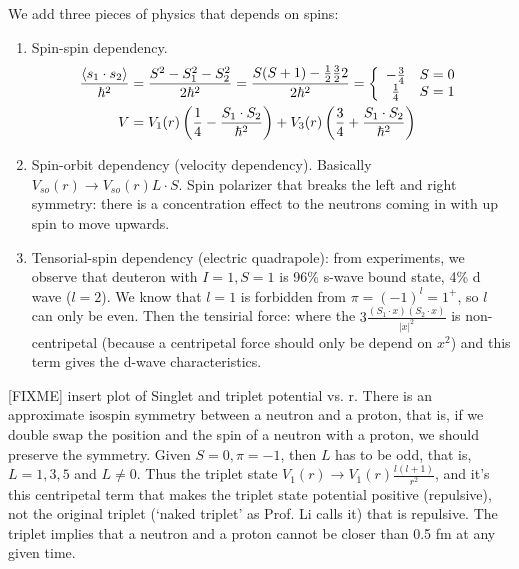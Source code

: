 \documentclass{school-22.101-notes}
\begin{document}
We add three pieces of physics that depends on spins: 
\begin{enumerate}
\item Spin-spin dependency. 
\begin{align}
 \frac{\left< s_1 \cdot s_2 \right>}{\hbar^2} &= \frac{S^2 - S_1^2 - S_2^2}{2 \hbar^2}  = \frac{S(S+1) - \frac{1}{2} \frac{3}{2} 2 }{2 \hbar^2} = \left\{  \begin{array}{cc} - \frac{3}{4} & S = 0 \\ \frac{1}{4}  & S= 1 \end{array} \right. \\
V &= V_1 (r) \left( \frac{1}{4} - \frac{S_1 \cdot S_2}{\hbar^2} \right) + V_3 (r) \left( \frac{3}{4} + \frac{S_1 \cdot S_2}{\hbar^2} \right)
\end{align}


\item Spin-orbit dependency (velocity dependency). Basically $\displaystyle V_{so}(r) \to V_{so} (r) L \cdot S$. Spin polarizer that breaks the left and right symmetry: there is a concentration effect to the neutrons coming in with up spin to move upwards. 

\item Tensorial-spin dependency (electric quadrapole): from experiments, we observe that deuteron with $I = 1, S=1$ is 96\% s-wave bound state, 4\% d wave ($l=2$). We know that $l=1$ is forbidden from $\pi = (-1)^l = 1^+$, so $l$ can only be even. Then the tensirial force: 
where the $3 \frac{(S_1 \cdot x) (S_2 \cdot x)}{|x|^2}$ is non-centripetal (because a centripetal force should only be depend on $x^2$) and this term gives the d-wave characteristics.  
\end{enumerate}

[FIXME] insert plot of Singlet and triplet potential vs. r. 
There is an approximate isospin symmetry between a neutron and a proton, that is, if we double swap the position and the spin of a neutron with a proton, we should preserve the symmetry. Given $S=0, \pi = -1$, then $L$ has to be odd, that is, $L=1,3,5$ and $L \neq 0$. Thus the triplet state $V_1(r) \to V_1(r) \frac{l(l+1)}{r^2}$, and it's this centripetal term that makes the triplet state potential positive (repulsive), not the original triplet (`naked triplet' as Prof. Li calls it) that is repulsive. The triplet implies that a neutron and a proton cannot be closer than 0.5 fm at any given time. 
\end{document}
